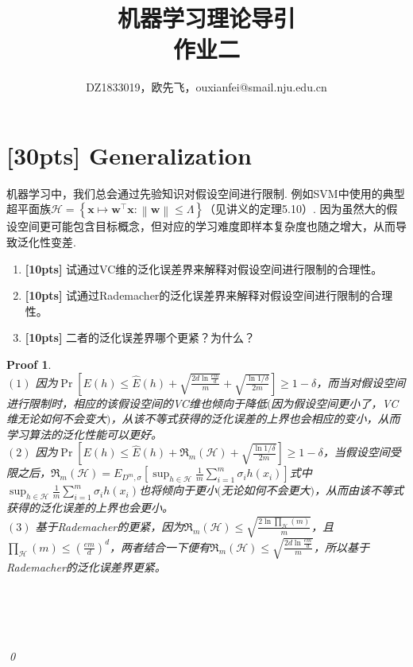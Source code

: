 \documentclass[a4paper,UTF8]{article}
\numberwithin{equation}{section}
\newtheorem*{myProof}{Proof}
\begin{document}
\renewcommand{\tilde}{\widetilde}
\renewcommand{\hat}{\widehat}

	\title{机器学习理论导引\\
		作业二}
	\author{DZ1833019，欧先飞，ouxianfei@smail.nju.edu.cn}
	\maketitle
	
	
	\section{[30pts] Generalization}
	
	机器学习中，我们总会通过先验知识对假设空间进行限制. 例如SVM中使用的典型超平面族$\mathcal{H} = \left\lbrace \boldsymbol{x} \mapsto \boldsymbol{w}^{\top}\boldsymbol{x} : \left\| \boldsymbol{w} \right\| \leq \Lambda  \right\rbrace $（见讲义的定理5.10）. 因为虽然大的假设空间更可能包含目标概念，但对应的学习难度即样本复杂度也随之增大，从而导致泛化性变差.
	
	
	\begin{enumerate}[(1)]
		\item \textbf{[10pts]}  试通过VC维的泛化误差界来解释对假设空间进行限制的合理性。
		
		\item \textbf{[10pts]}  试通过Rademacher的泛化误差界来解释对假设空间进行限制的合理性。
		
		\item \textbf{[10pts]}	二者的泛化误差界哪个更紧？为什么？
	\end{enumerate}
	
	
	\begin{myProof}~\\
$(1)$ 因为$\Pr[E(h) \le \hat{E}(h) +  \sqrt{\frac{2d\ln \frac{em}{d}}{m}} + \sqrt{\frac{\ln 1 / \delta}{2m}}] \ge 1 - \delta$，而当对假设空间进行限制时，相应的该假设空间的VC维也倾向于降低$($因为假设空间更小了，VC维无论如何不会变大$)$，从该不等式获得的泛化误差的上界也会相应的变小，从而学习算法的泛化性能可以更好。
~\\
$(2)$ 因为$\Pr[E(h) \le \hat{E}(h) + \mathfrak{R}_m(\mathcal{H})  + \sqrt{\frac{\ln 1 / \delta}{2m}}] \ge 1 - \delta$，当假设空间受限之后，$\mathfrak{R}_m(\mathcal{H}) = E_{D^m, \sigma}[\sup_{h \in \mathcal{H}}\frac{1}{m} \sum_{i=1}^m \sigma_i h(x_i) ]$式中$\sup_{h \in \mathcal{H}}\frac{1}{m} \sum_{i=1}^m \sigma_i h(x_i)$也将倾向于更小$($无论如何不会更大$)$，从而由该不等式获得的泛化误差的上界也会更小。
~\\
$(3)$ 基于Rademacher的更紧，因为$\mathfrak{R}_m(\mathcal{H}) \le \sqrt{\frac{2\ln \prod_\mathcal{H}(m)}{m}}$，且$\prod_{\mathcal{H}}(m) \le \left( \frac{em}{d}  \right)^d$，两者结合一下便有$\mathfrak{R}_m(\mathcal{H}) \le \sqrt{\frac{2d \ln \frac{em}{d}}{m}}$，所以基于Rademacher的泛化误差界更紧。
		
		~\\
		~\\
		~\\
		~\\
		\qed
	\end{myProof}
	\newpage
\end{document}

